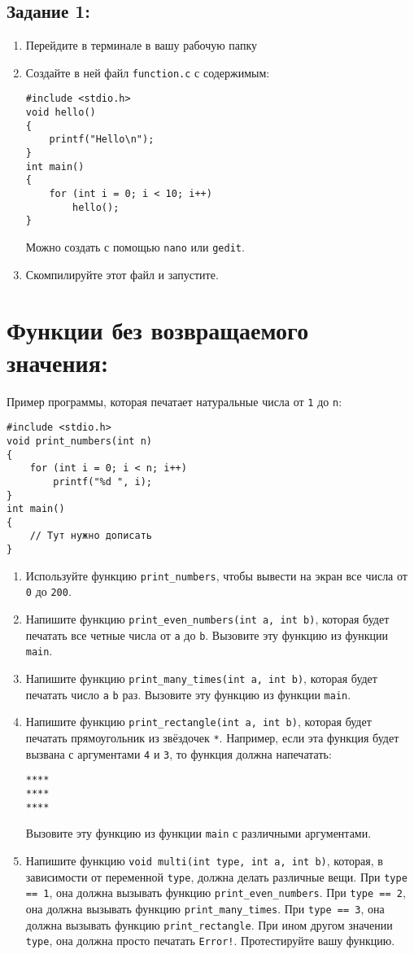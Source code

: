 \documentclass{article}
\begin{document}
\subsection*{Задание 1:}
\begin{enumerate}
\item Перейдите в терминале в вашу рабочую папку
\item Создайте в ней файл \texttt{function.c} с содержимым:
\begin{lstlisting}
#include <stdio.h>
void hello()
{
	printf("Hello\n");
}	
int main()
{
	for (int i = 0; i < 10; i++)
		hello();
}
\end{lstlisting}
Можно создать с помощью \texttt{nano} или \texttt{gedit}.
\item Скомпилируйте этот файл и запустите.
\end{enumerate}

\section*{Функции без возвращаемого значения:}
Пример программы, которая печатает натуральные числа от \texttt{1} до \texttt{n}:
\begin{lstlisting}
#include <stdio.h>
void print_numbers(int n)
{
	for (int i = 0; i < n; i++)
		printf("%d ", i);
}	
int main()
{
	// Тут нужно дописать
}
\end{lstlisting}
\begin{enumerate}
\item Используйте функцию \texttt{print\_numbers}, чтобы вывести на экран все числа от \texttt{0} до \texttt{200}.
\item Напишите функцию \texttt{print\_even\_numbers(int a, int b)}, которая будет печатать все четные числа от \texttt{a} до \texttt{b}. Вызовите эту функцию из функции \texttt{main}.
\item Напишите функцию \texttt{print\_many\_times(int a, int b)}, которая будет печатать число \texttt{a} \texttt{b} раз. Вызовите эту функцию из функции \texttt{main}.
\item Напишите функцию \texttt{print\_rectangle(int a, int b)}, которая будет печатать прямоугольник из звёздочек \texttt{*}.  Например, если эта функция будет вызвана с аргументами \texttt{4} и \texttt{3}, то функция должна напечатать:
\begin{verbatim}
****
****
****
\end{verbatim}
Вызовите эту функцию из функции \texttt{main} с различными аргументами.
\item Напишите функцию \texttt{void multi(int type, int a, int b)}, которая, в зависимости от переменной \texttt{type}, должна делать различные вещи. При \texttt{type == 1}, она должна вызывать функцию  \texttt{print\_even\_numbers}. При \texttt{type == 2}, она должна вызывать функцию  \texttt{print\_many\_times}. При \texttt{type == 3}, она должна вызывать функцию  \texttt{print\_rectangle}. При ином другом значении \texttt{type}, она должна просто печатать \texttt{Error!}. Протестируйте вашу функцию.
\end{enumerate}
\end{document}
